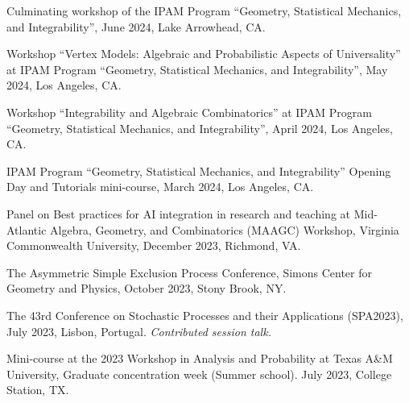 \documentclass[letterpaper,11pt]{article}
\begin{document}
\begin{etaremune}
	\item
		Culminating workshop of the
		IPAM Program ``Geometry, Statistical Mechanics, and Integrability'',
		June 2024, Lake Arrowhead, CA.
	\item
		Workshop
		``Vertex Models: Algebraic and Probabilistic Aspects of Universality''
		at
		IPAM Program ``Geometry, Statistical Mechanics, and Integrability'',
		May 2024, Los Angeles, CA.
	\item
		Workshop ``Integrability and Algebraic Combinatorics''
		at
		IPAM Program ``Geometry, Statistical Mechanics, and Integrability'',
		April 2024, Los Angeles, CA.
	\item
	IPAM Program ``Geometry, Statistical Mechanics, and Integrability''
	Opening Day and Tutorials mini-course, March 2024, Los Angeles, CA.
	\item
	Panel on Best practices for AI integration in research and teaching
	at
	Mid-Atlantic Algebra, Geometry, and Combinatorics (MAAGC) Workshop,
	Virginia Commonwealth University,
	December 2023,
	Richmond, VA.

	\item
	The Asymmetric Simple Exclusion Process Conference, Simons Center for Geometry and Physics, October 2023, Stony Brook, NY.

	\item
	The 43rd Conference on Stochastic Processes and their Applications (SPA2023), July 2023, Lisbon, Portugal.
	\emph{Contributed session talk.}

	\item
	Mini-course at the
	2023 Workshop in Analysis and Probability at Texas A\&M University, Graduate concentration week (Summer school). July 2023, College Station, TX.


\end{etaremune}
\end{document}
